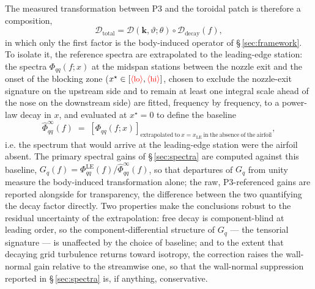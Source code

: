 \documentclass[lineno]{JFM-FLM_Au}
\newcommand{\tbd}[1]{\textcolor{red}{\ensuremath{\langle\mbox{\small #1}\rangle}}}
\begin{document}
The measured transformation between P3 and the toroidal patch is
therefore a composition,
\begin{equation}
  \mathcal{D}_{\mathrm{total}}
  = \mathcal{D}(\boldsymbol{k},\vartheta;\theta)
    \circ
    \mathcal{D}_{\mathrm{decay}}(f),
  \label{eq:composition}
\end{equation}
in which only the first factor is the body-induced operator of
\S\,\ref{sec:framework}. To isolate it, the reference spectra are
extrapolated to the leading-edge station: the spectra
$\Phi_{qq}(f;x)$ at the midspan stations between the nozzle exit and the
onset of the blocking zone
($x^\star \in [\tbd{lo}, \tbd{hi}]$, chosen to exclude the nozzle-exit
signature on the upstream side and to remain at least one integral scale
ahead of the nose on the downstream side) are fitted, frequency by
frequency, to a power-law decay in $x$, and evaluated at
$x^\star = 0$ to define the baseline
\begin{equation}
  \widehat{\Phi}^{\infty}_{qq}(f)
  \;=\;
  \left[\Phi_{qq}(f;x)\right]_{\mathrm{extrapolated\ to\ }
  x = x_{\mathrm{LE}}\ \mathrm{in\ the\ absence\ of\ the\ airfoil}},
  \label{eq:baseline}
\end{equation}
i.e. the spectrum that would arrive at the leading-edge station were the
airfoil absent. The primary spectral gains of
\S\,\ref{sec:spectra} are computed against this baseline,
$G_q(f) = \Phi^{\mathrm{LE}}_{qq}(f)/\widehat{\Phi}^{\infty}_{qq}(f)$,
so that departures of $G_q$ from unity measure the body-induced
transformation alone; the raw, P3-referenced gains are reported alongside
for transparency, the difference between the two quantifying the decay
factor directly.
Two properties make the conclusions robust to the residual uncertainty of
the extrapolation: free decay is component-blind at leading order, so the
component-differential structure of $G_q$ --- the tensorial signature ---
is unaffected by the choice of baseline; and to the extent that decaying
grid turbulence returns toward isotropy, the correction raises the
wall-normal gain relative to the streamwise one, so that the wall-normal
suppression reported in \S\,\ref{sec:spectra} is, if anything,
conservative.
\end{document}
